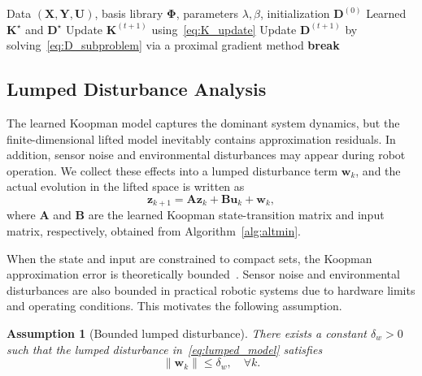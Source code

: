 \documentclass[final,3p,twocolumn,times]{elsarticle}
\newtheorem{assumption}{Assumption}[section]
\newcommand{\uvec}{\mathbf{u}}
\newcommand{\z}{\mathbf{z}}
\newcommand{\w}{\mathbf{w}}
\newcommand{\Kmat}{\mathbf{K}}
\newcommand{\Dmat}{\mathbf{D}}
\newcommand{\A}{\mathbf{A}}
\newcommand{\B}{\mathbf{B}}
\newcommand{\Umat}{\mathbf{U}}
\newcommand{\X}{\mathbf{X}}
\newcommand{\Y}{\mathbf{Y}}
\newcommand{\Phib}{\boldsymbol{\Phi}}
\begin{document}
\begin{algorithm}[htbp]
\caption{Block Coordinate Descent Algorithm for Koopman Representation Learning}
\label{alg:altmin}
\begin{algorithmic}[1]
\REQUIRE Data $(\X,\Y,\Umat)$, basis library $\Phib$, parameters $\lambda,\beta$, initialization $\Dmat^{(0)}$
\ENSURE Learned $\Kmat^\star$ and $\Dmat^\star$
    \STATE Update $\Kmat^{(t+1)}$ using~\eqref{eq:K_update}
    \STATE Update $\Dmat^{(t+1)}$ by solving~\eqref{eq:D_subproblem} via a proximal gradient method
        \STATE \textbf{break}
    \ENDIF
\ENDFOR
\end{algorithmic}
\end{algorithm}

\subsection{Lumped Disturbance Analysis}
\label{subsec:error_quantification}

The learned Koopman model captures the dominant system dynamics, but the finite-dimensional lifted model inevitably contains approximation residuals. In addition, sensor noise and environmental disturbances may appear during robot operation. We collect these effects into a lumped disturbance term $\w_k$, and the actual evolution in the lifted space is written as
\begin{equation}
\label{eq:lumped_model}
\z_{k+1} = \A\z_k + \B\uvec_k + \w_k,
\end{equation}
where $\A$ and $\B$ are the learned Koopman state-transition matrix and input matrix, respectively, obtained from Algorithm~\ref{alg:altmin}.

When the state and input are constrained to compact sets, the Koopman approximation error is theoretically bounded~\cite{Korda2018MPC}. Sensor noise and environmental disturbances are also bounded in practical robotic systems due to hardware limits and operating conditions. This motivates the following assumption.

{
\begin{assumption}[Bounded lumped disturbance]
\label{assump:bounded_disturbance}
There exists a constant $\delta_w>0$ such that the lumped disturbance in~\eqref{eq:lumped_model} satisfies
\begin{equation}
\|\w_k\| \le \delta_w, \quad \forall k.
\end{equation}
\end{assumption}
}
\end{document}
